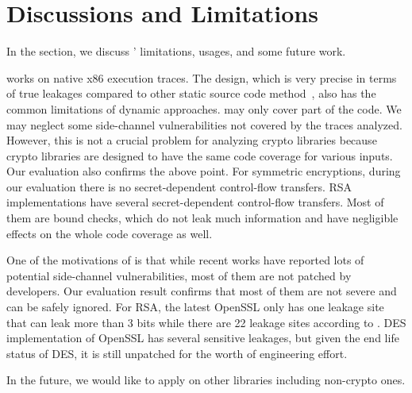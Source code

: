 \section{Discussions and Limitations}
In the section, we discuss \tool' limitations, usages, and some future work.

\tool{} works on native x86 execution traces. The design, which is very
precise in terms of true leakages compared to other static source code
method~\cite{197207,BacelarAlmeida:2013:FVS:2483313.2483334}, also has 
the common limitations of dynamic approaches. \tool{} may only cover part of the code.
We may 
neglect some side-channel vulnerabilities not covered by the traces analyzed.
However, this is not a crucial problem for analyzing crypto libraries because crypto
libraries are designed to have the same code coverage for various inputs. Our
evaluation also confirms the above point. For symmetric encryptions, during our
evaluation there is no secret-dependent control-flow transfers. RSA
implementations have several secret-dependent control-flow transfers. 
Most of them are  %
bound checks, which do not leak much information and have negligible effects
on the whole code coverage as well.

One of the motivations of \tool{} is that while recent works have reported lots
of potential side-channel vulnerabilities, most of them are not patched by
developers. Our evaluation result confirms that most of them are not severe and can be safely ignored.
For RSA, the latest
OpenSSL only has one leakage site that can leak more than 3 bits while there
are 22 leakage sites according to \tool{}. DES implementation of OpenSSL has
several sensitive leakages, but given the end life status of DES, it is still
unpatched for the worth of engineering effort. 

In the future, we would like to apply \tool{} on other libraries including 
non-crypto ones. 

